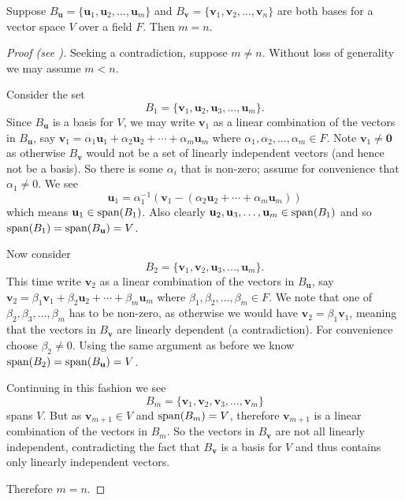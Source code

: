 \begin{theorem}\label{thrm-dimension-theorem-for-finite-bases}
    Suppose $B_\mathbf{u} = \{\mathbf{u}_1, \mathbf{u}_2, \dots, \mathbf{u}_m\}$ and $B_\mathbf{v} = \{\mathbf{v}_1, \mathbf{v}_2, \dots, \mathbf{v}_n\}$ are both bases for a vector space $V$ over a field $F$. Then $m = n$.
\end{theorem}
\begin{proof}[Proof (see {\cite[Theorem 19.1]{gallian_2016}})]
    Seeking a contradiction, suppose $m \neq n$. Without loss of generality we may assume $m < n$.

    Consider the set
    \[
        B_1 = \{\mathbf{v}_1, \mathbf{u}_2, \mathbf{u}_3, \dots, \mathbf{u}_m\}.
    \]
    Since $B_\mathbf{u}$ is a basis for $V$, we may write $\mathbf{v}_1$ as a linear combination of the vectors in $B_\mathbf{u}$, say $\mathbf{v}_1 = \alpha_1\mathbf{u}_1 + \alpha_2\mathbf{u}_2 + \cdots + \alpha_m\mathbf{u}_m$ where $\alpha_1, \alpha_2, \dots, \alpha_m \in F$. Note $\mathbf{v}_1 \neq \mathbf{0}$ as otherwise $B_\mathbf{v}$ would not be a set of linearly independent vectors (and hence not be a basis). So there is some $\alpha_i$ that is non-zero; assume for convenience that $\alpha_1 \neq 0$. We see
    \[
        \mathbf{u}_1 = \alpha_1^{-1}\left(\mathbf{v}_1 - \left(\alpha_2\mathbf{u}_2 + \cdots + \alpha_m\mathbf{u}_m\right)\right)
    \]
    which means $\mathbf{u}_1 \in \mathrm{span}(B_1)$. Also clearly $\mathbf{u}_2, \mathbf{u}_3, \dots, \mathbf{u}_m \in \mathrm{span}(B_1)$ and so $\mathrm{span}(B_1) = \mathrm{span}(B_\mathbf{u}) = V$.

    Now consider
    \[
        B_2 = \{\mathbf{v}_1, \mathbf{v}_2, \mathbf{u}_3, \dots, \mathbf{u}_m\}.
    \]
    This time write $\mathbf{v}_2$ as a linear combination of the vectors in $B_\mathbf{u}$, say $\mathbf{v}_2 = \beta_1\mathbf{v}_1 + \beta_2\mathbf{u}_2 + \cdots + \beta_m\mathbf{u}_m$ where $\beta_1, \beta_2, \dots, \beta_m \in F$. We note that one of $\beta_2, \beta_3, \dots, \beta_m$ has to be non-zero, as otherwise we would have $\mathbf{v}_2 = \beta_1\mathbf{v}_1$, meaning that the vectors in $B_\mathbf{v}$ are linearly dependent (a contradiction). For convenience choose $\beta_2 \neq 0$. Using the same argument as before we know $\mathrm{span}(B_2) = \mathrm{span}(B_\mathbf{u}) = V$.

    Continuing in this fashion we see
    \[
        B_m = \{\mathbf{v}_1, \mathbf{v}_2, \mathbf{v}_3, \dots, \mathbf{v}_m\}
    \]
    spans $V$. But as $\mathbf{v}_{m+1} \in V$ and $\mathrm{span}(B_m) = V$, therefore $\mathbf{v}_{m+1}$ is a linear combination of the vectors in $B_m$. So the vectors in $B_\mathbf{v}$ are not all linearly independent, contradicting the fact that $B_\mathbf{v}$ is a basis for $V$ and thus contains only linearly independent vectors.

    Therefore $m = n$.
\end{proof}

